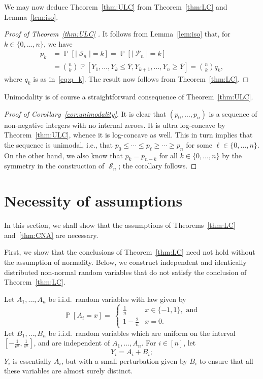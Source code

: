 \documentclass[12pt,english,reqno]{amsart}
\theoremstyle{plain}
\theoremstyle{remark}
\numberwithin{figure}{section}
\numberwithin{equation}{section}
\def\bY{\overline{Y}}
\DeclareMathOperator{\Pb}{\mathbb{P}} %
\DeclareMathOperator{\cP}{\mathcal{P}} %
\DeclareMathOperator{\cS}{\mathcal{S}} %
\def\ap{p} %
\def\aq{q} %
\begin{document}
We may now deduce Theorem~\ref{thm:ULC} from Theorem~\ref{thm:LC} and Lemma~\ref{lem:iso}.
\begin{proof}[Proof of Theorem~\ref{thm:ULC} ]
	It follows from Lemma~\ref{lem:iso} that, for $k \in \{0,\dots,n\}$, we have
	\begin{align*}
		\ap_k & = \Pb[|\cS_n|=k] = \Pb[|\cP_n|=k]                                                               \\
		      & = \binom{n}{k} \Pb[Y_1, \dots, Y_k \leq \bY, Y_{k+1},\dots, Y_n \geq \bY] = \binom{n}{k} \aq_k,
	\end{align*}
	where $\aq_k$ is as in~\eqref{eq:q_k}. The result now follows from Theorem~\ref{thm:LC}.
\end{proof}

Unimodality is of course a straightforward consequence of Theorem~\ref{thm:ULC}.
\begin{proof}[Proof of Corollary~\ref{cor:unimodality}]
	It is clear that $(\ap_{0},\dots, \ap_{n})$ is a sequence of non-negative integers with no internal zeroes. It is ultra log-concave by Theorem~\ref{thm:ULC}, whence it is  log-concave as well. This in turn implies that the sequence is unimodal, i.e., that $\ap_0 \leq \cdots \leq \ap_{\ell} \geq \cdots \geq \ap_{n}$ for some $\ell \in \{0,\dots,n\}$. On the other hand, we also know that $\ap_{k}=\ap_{n-k}$ for all $k \in \{0,\dots,n\}$ by the symmetry in the construction of $\cS_n$; the corollary follows.
\end{proof}


\section{Necessity of assumptions}\label{sec:counter-example}
In this section, we shall show that the assumptions of Theorems~\ref{thm:LC} and~\ref{thm:CNA} are necessary.

First, we show that the conclusions of Theorem~\ref{thm:LC} need not hold without the assumption of normality. Below, we construct independent and identically distributed non-normal random variables that do not satisfy the conclusion of Theorem~\ref{thm:LC}.

Let $A_1, \dots, A_n$ be i.i.d.\ random variables with law given by
\[ \Pb[A_i =x ] =
	\
	\begin{cases}
		\tfrac{1}{n}   & x \in \{-1, 1\}, \text{ and} \\
		1-\tfrac{2}{n} & x = 0.
	\end{cases}
\]
Let $B_1,\dots, B_n$ be i.i.d.\ random variables which are uniform on the interval $[-\tfrac{1}{e^n}, \tfrac{1}{e^n}]$, and are independent of $A_1,\dots, A_n$.
For $i \in [n]$, let
\[ Y_i = A_i+B_i; \]
$Y_i$ is essentially $A_i$, but with a small perturbation given by $B_i$ to ensure that all these variables are almost surely distinct.
\end{document}
